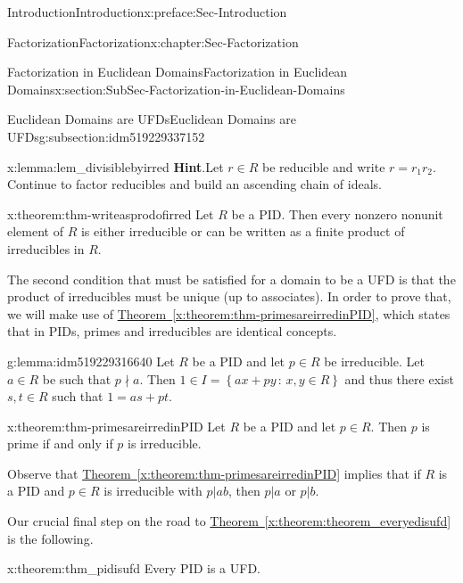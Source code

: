 \documentclass[oneside,10pt,]{book}
\newcommand{\blocktitlefont}{\relax}
\newcommand{\xreffont}{\relax}
\numberwithin{equation}{section}
\newcommand{\setof}[2]{{\left\{#1\,\colon\,#2\right\}}}
\begin{document}
\begin{preface}{Introduction}{}{Introduction}{}{}{x:preface:Sec-Introduction}
\begin{chapterptx}{Factorization}{}{Factorization}{}{}{x:chapter:Sec-Factorization}
\begin{sectionptx}{Factorization in Euclidean Domains}{}{Factorization in Euclidean Domains}{}{}{x:section:SubSec-Factorization-in-Euclidean-Domains}
\begin{subsectionptx}{Euclidean Domains are UFDs}{}{Euclidean Domains are UFDs}{}{}{g:subsection:idm519229337152}
\begin{lemma}{}{}{x:lemma:lem_divisiblebyirred}
\textbf{\blocktitlefont Hint}.\quad{}Let \(r\in R\) be reducible and write \(r = r_1 r_2\). Continue to factor reducibles and build an ascending chain of ideals.%
\end{lemma}
\begin{theorem}{}{}{x:theorem:thm-writeasprodofirred}%
Let \(R\) be a PID. Then every nonzero nonunit element of \(R\) is either irreducible or can be written as a finite product of irreducibles in \(R\).%
\end{theorem}
The second condition that must be satisfied for a domain to be a UFD is that the product of irreducibles must be unique (up to associates). In order to prove that, we will make use of \hyperref[x:theorem:thm-primesareirredinPID]{Theorem~{\xreffont\ref{x:theorem:thm-primesareirredinPID}}}, which states that in PIDs, primes and irreducibles are identical concepts.%
\begin{lemma}{}{}{g:lemma:idm519229316640}%
Let \(R\) be a PID and let \(p\in R\) be irreducible. Let \(a\in R\) be such that \(p\nmid a\). Then \(1\in I = \setof{ax+py}{x,y\in R}\) and thus there exist \(s,t\in R\) such that \(1 = as+pt\).%
\end{lemma}
\begin{theorem}{}{}{x:theorem:thm-primesareirredinPID}%
Let \(R\) be a PID and let \(p\in R\). Then \(p\) is prime if and only if \(p\) is irreducible.%
\end{theorem}
Observe that \hyperref[x:theorem:thm-primesareirredinPID]{Theorem~{\xreffont\ref{x:theorem:thm-primesareirredinPID}}} implies that if \(R\) is a PID and \(p\in R\) is irreducible with \(p|ab\), then \(p|a\) or \(p|b\).%
\par
Our crucial final step on the road to \hyperref[x:theorem:theorem_everyedisufd]{Theorem~{\xreffont\ref{x:theorem:theorem_everyedisufd}}} is the following.%
\begin{theorem}{}{}{x:theorem:thm_pidisufd}%
Every PID is a UFD.%



\end{theorem}
\end{subsectionptx}
\end{sectionptx}
\end{chapterptx}
\end{preface}
\end{document}
